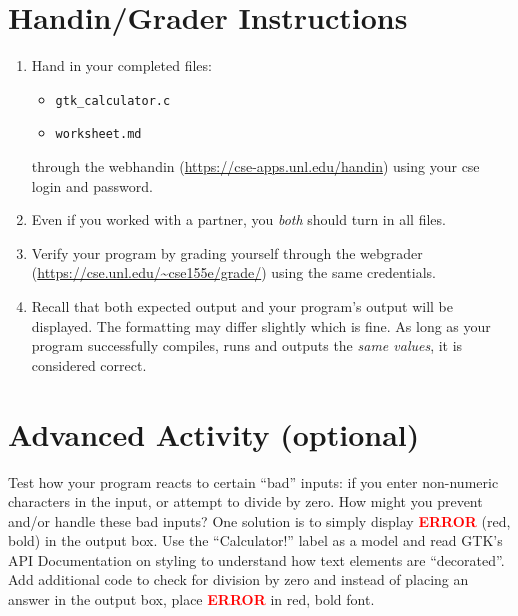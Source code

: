 \documentclass[12pt]{scrartcl}
\begin{document}
\section{Handin/Grader Instructions}

\begin{enumerate}
  \item Hand in your completed files:
  \begin{itemize}
    \item \texttt{gtk_calculator.c}
    \item \texttt{worksheet.md}
  \end{itemize}
  through the webhandin (\url{https://cse-apps.unl.edu/handin}) 
  using your cse login and password.  
  \item Even if you worked with a partner, you \emph{both} should
  turn in all files.
  \item Verify your program by grading yourself through the
  webgrader (\url{https://cse.unl.edu/~cse155e/grade/}) using the
  same credentials.
  \item Recall that both expected output and your program's output
  will be displayed.  The formatting may differ slightly which is fine.
  As long as your program successfully compiles, runs and outputs 
  the \emph{same values}, it is considered correct.
\end{enumerate}


\section{Advanced Activity (optional)}

Test how your program reacts to certain ``bad'' inputs: if you enter 
non-numeric characters in the input, or attempt to divide by zero.  
How might you prevent and/or handle these bad inputs?  One 
solution is to simply display \textbf{\textcolor{red}{ERROR}} (red, 
bold) in the output box.  Use the ``Calculator!'' label as a model 
and read GTK's API Documentation on styling to understand 
how text elements are ``decorated''.  Add additional code to 
check for division by zero and instead of placing an answer in 
the output box, place \textbf{\textcolor{red}{ERROR}} in red, bold font.

	
\end{document}
